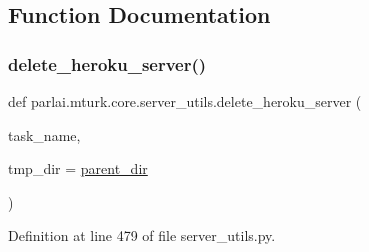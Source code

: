 \subsection{Function Documentation}
\mbox{\label{namespaceparlai_1_1mturk_1_1core_1_1server__utils_a8dfde882f9d6ff492ca565ae2334fc70}} 
\subsubsection{\texorpdfstring{delete\+\_\+heroku\+\_\+server()}{delete\_heroku\_server()}}
{\footnotesize\ttfamily def parlai.\+mturk.\+core.\+server\+\_\+utils.\+delete\+\_\+heroku\+\_\+server (\begin{DoxyParamCaption}\item[{}]{task\+\_\+name,  }\item[{}]{tmp\+\_\+dir = {\ttfamily \hyperlink{namespaceparlai_1_1mturk_1_1core_1_1server__utils_a193439bdbc25a32b00f1a43e6f8532d8}{parent\+\_\+dir}} }\end{DoxyParamCaption})}



Definition at line 479 of file server\+\_\+utils.\+py.



